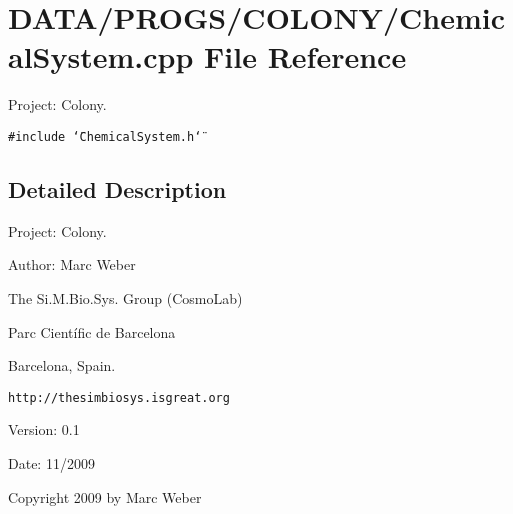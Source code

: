 \section{DATA/PROGS/COLONY/ChemicalSystem.cpp File Reference}
\label{ChemicalSystem_8cpp}
Project: Colony. 

{\tt \#include \char`\"{}ChemicalSystem.h\char`\"{}}\par


\subsection{Detailed Description}
Project: Colony. 

\begin{Desc}
\item[Author:]Marc Weber\par
 The Si.M.Bio.Sys. Group (CosmoLab)\par
 Parc Científic de Barcelona\par
 Barcelona, Spain.\par
 {\tt http://thesimbiosys.isgreat.org} \end{Desc}
\begin{Desc}
\item[Version:]0.1 \end{Desc}
\begin{Desc}
\item[Date:]11/2009\end{Desc}
Copyright 2009 by Marc Weber 